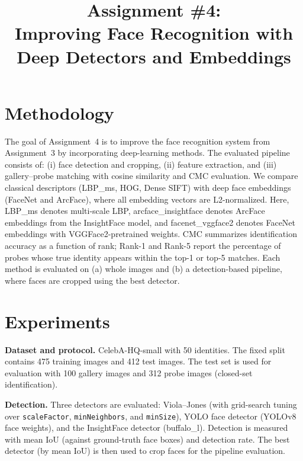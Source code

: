 ﻿\documentclass[conference]{IEEEtran}
\begin{document}
\title{Assignment \#4:\\Improving Face Recognition with Deep Detectors and Embeddings}

\author{
}

\maketitle


\section{Methodology}
The goal of Assignment~4 is to improve the face recognition system from Assignment~3 by incorporating deep-learning methods.
The evaluated pipeline consists of: (i) face detection and cropping, (ii) feature extraction, and (iii) gallery--probe matching with cosine similarity and CMC evaluation.
We compare classical descriptors (LBP\_ms, HOG, Dense SIFT) with deep face embeddings (FaceNet and ArcFace), where all embedding vectors are L2-normalized.
Here, LBP\_ms denotes multi-scale LBP, arcface\_insightface denotes ArcFace embeddings from the InsightFace model, and facenet\_vggface2 denotes FaceNet embeddings with VGGFace2-pretrained weights.
CMC summarizes identification accuracy as a function of rank; Rank-1 and Rank-5 report the percentage of probes whose true identity appears within the top-1 or top-5 matches.
Each method is evaluated on (a) whole images and (b) a detection-based pipeline, where faces are cropped using the best detector.

\section{Experiments}
\textbf{Dataset and protocol.} CelebA-HQ-small with 50 identities. The fixed split contains 475 training images and 412 test images.
The test set is used for evaluation with 100 gallery images and 312 probe images (closed-set identification).

\textbf{Detection.} Three detectors are evaluated: Viola--Jones (with grid-search tuning over \texttt{scaleFactor}, \texttt{minNeighbors}, and \texttt{minSize}), YOLO face detector (YOLOv8 face weights), and the InsightFace detector (buffalo\_l).
Detection is measured with mean IoU (against ground-truth face boxes) and detection rate.
The best detector (by mean IoU) is then used to crop faces for the pipeline evaluation.
\end{document}
